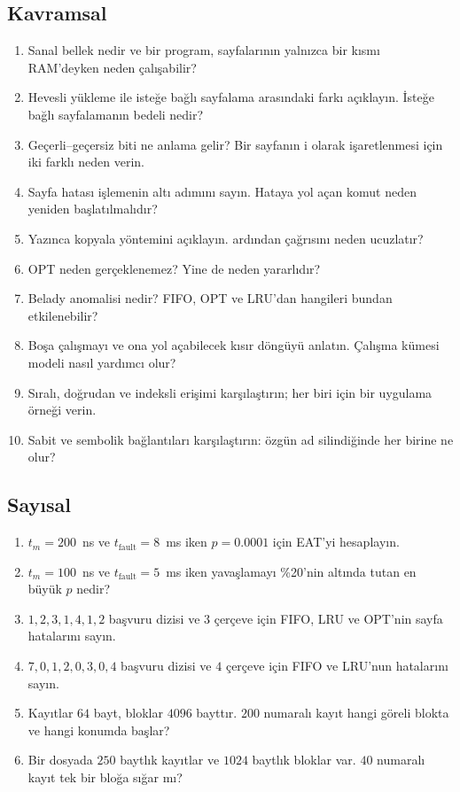 \subsection*{Kavramsal}
\begin{enumerate}[leftmargin=1.6em]
  \item Sanal bellek nedir ve bir program, sayfalarının yalnızca bir kısmı RAM'deyken neden çalışabilir?
  \item Hevesli yükleme ile isteğe bağlı sayfalama arasındaki farkı açıklayın. İsteğe bağlı sayfalamanın bedeli nedir?
  \item Geçerli--geçersiz biti ne anlama gelir? Bir sayfanın i olarak işaretlenmesi için iki farklı neden verin.
  \item Sayfa hatası işlemenin altı adımını sayın. Hataya yol açan komut neden yeniden başlatılmalıdır?
  \item Yazınca kopyala yöntemini açıklayın.  ardından  çağrısını neden ucuzlatır?
  \item OPT neden gerçeklenemez? Yine de neden yararlıdır?
  \item Belady anomalisi nedir? FIFO, OPT ve LRU'dan hangileri bundan etkilenebilir?
  \item Boşa çalışmayı ve ona yol açabilecek kısır döngüyü anlatın. Çalışma kümesi modeli nasıl yardımcı olur?
  \item Sıralı, doğrudan ve indeksli erişimi karşılaştırın; her biri için bir uygulama örneği verin.
  \item Sabit ve sembolik bağlantıları karşılaştırın: özgün ad silindiğinde her birine ne olur?
\end{enumerate}

\subsection*{Sayısal}
\begin{enumerate}[leftmargin=1.6em,resume]
  \item $t_m = 200$~ns ve $t_{\text{fault}} = 8$~ms iken $p = 0.0001$ için EAT'yi hesaplayın.
  \item $t_m = 100$~ns ve $t_{\text{fault}} = 5$~ms iken yavaşlamayı \%20'nin altında tutan en büyük $p$ nedir?
  \item $1, 2, 3, 1, 4, 1, 2$ başvuru dizisi ve $3$ çerçeve için FIFO, LRU ve OPT'nin sayfa hatalarını sayın.
  \item $7, 0, 1, 2, 0, 3, 0, 4$ başvuru dizisi ve $4$ çerçeve için FIFO ve LRU'nun hatalarını sayın.
  \item Kayıtlar $64$ bayt, bloklar $4096$ bayttır. $200$ numaralı kayıt hangi göreli blokta ve hangi konumda başlar?
  \item Bir dosyada $250$ baytlık kayıtlar ve $1024$ baytlık bloklar var. $40$ numaralı kayıt tek bir bloğa sığar mı?
\end{enumerate}

